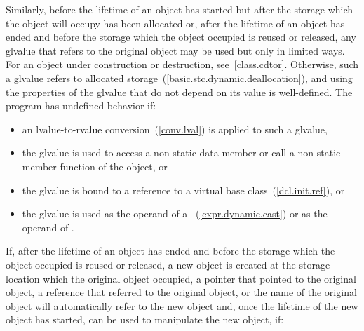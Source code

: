 \pnum
Similarly, before the lifetime of an object has started but after the
storage which the object will occupy has been allocated or, after the
lifetime of an object has ended and before the storage which the object
occupied is reused or released, any glvalue that refers to the original
object may be used but only in limited ways.
For an object under construction or destruction, see~\ref{class.cdtor}.
Otherwise, such
a glvalue refers to
allocated storage~(\ref{basic.stc.dynamic.deallocation}), and using the
properties of the glvalue that do not depend on its value is
well-defined. The program has undefined behavior if:

\begin{itemize}
\item an lvalue-to-rvalue conversion~(\ref{conv.lval}) is applied to such a glvalue,

\item the glvalue is used to access a non-static data member or call a
non-static member function of the object, or

\item the glvalue is bound to a reference
to a virtual base class~(\ref{dcl.init.ref}), or

\item the glvalue is used as the operand of a
~(\ref{expr.dynamic.cast}) or as the operand of
.
\end{itemize}

\pnum
If, after the lifetime of an object has ended and before the storage
which the object occupied is reused or released, a new object is created
at the storage location which the original object occupied, a pointer
that pointed to the original object, a reference that referred to the
original object, or the name of the original object will automatically
refer to the new object and, once the lifetime of the new object has
started, can be used to manipulate the new object, if:

